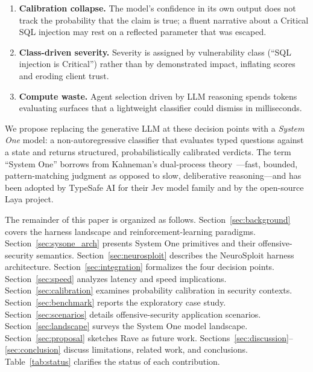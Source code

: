 \documentclass[conference]{IEEEtran}
\begin{document}
\begin{enumerate}[leftmargin=*]
\item \textbf{Calibration collapse.} The model's confidence in its own output does not track the probability that the claim is true; a fluent narrative about a Critical SQL injection may rest on a reflected parameter that was escaped.
\item \textbf{Class-driven severity.} Severity is assigned by vulnerability class (``SQL injection is Critical'') rather than by demonstrated impact, inflating scores and eroding client trust.
\item \textbf{Compute waste.} Agent selection driven by LLM reasoning spends tokens evaluating surfaces that a lightweight classifier could dismiss in milliseconds.
\end{enumerate}

We propose replacing the generative LLM at these decision points with a \emph{System One} model: a non-autoregressive classifier that evaluates typed questions against a state and returns structured, probabilistically calibrated verdicts. The term ``System One'' borrows from Kahneman's dual-process theory~\cite{kahneman2011thinking}---fast, bounded, pattern-matching judgment as opposed to slow, deliberative reasoning---and has been adopted by TypeSafe AI for their Jev model family and by the open-source Laya project.

The remainder of this paper is organized as follows. Section~\ref{sec:background} covers the harness landscape and reinforcement-learning paradigms. Section~\ref{sec:sysone_arch} presents System One primitives and their offensive-security semantics. Section~\ref{sec:neurosploit} describes the NeuroSploit harness architecture. Section~\ref{sec:integration} formalizes the four decision points. Section~\ref{sec:speed} analyzes latency and speed implications. Section~\ref{sec:calibration} examines probability calibration in security contexts. Section~\ref{sec:benchmark} reports the exploratory case study. Section~\ref{sec:scenarios} details offensive-security application scenarios. Section~\ref{sec:landscape} surveys the System One model landscape. Section~\ref{sec:proposal} sketches Rave as future work. Sections~\ref{sec:discussion}--\ref{sec:conclusion} discuss limitations, related work, and conclusions. Table~\ref{tab:status} clarifies the status of each contribution.
\end{document}
